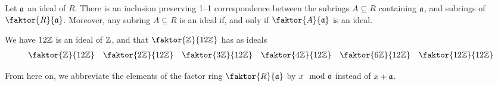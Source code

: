\begin{theorem}\label{theorem_5.3.7}
  Let $\mathfrak{a}$ an ideal of $R$. There is an inclusion preserving 1--1
  correspondence between the subrings $A \subseteq R$ containing
  $\mathfrak{a}$, and subrings of $\faktor{R}{\af}$. Moreover, any subring $A
  \subseteq R$ is an ideal if, and only if $\faktor{A}{\af}$ is an
  ideal.
\end{theorem}

\begin{example}\label{example_5.11}
  We have $12\mathbb{Z}$ is an ideal of  $\mathbb{Z}$, and that  $\faktor{\Z}{12\Z}$ has as
  ideals
  \begin{align*}
    \faktor{\Z}{12\Z} && \faktor{2\Z}{12\Z} && \faktor{3\Z}{12\Z} &&
    \faktor{4\Z}{12\Z} && \faktor{6\Z}{12\Z} && \faktor{12\Z}{12\Z}
  \end{align*}
\end{example}

\begin{remark}
  From here on, we abbreviate the elements of the factor ring
  $\faktor{R}{\af}$ by $x \mod{\mathfrak{a}}$ instead of $x+\mathfrak{a}$.
\end{remark}
